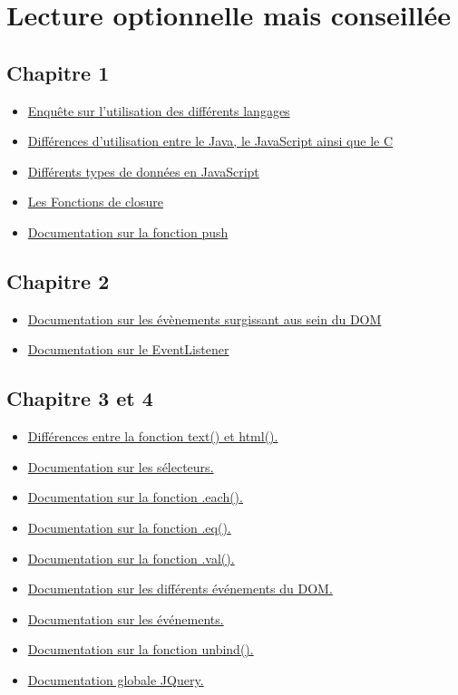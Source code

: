 \documentclass{article}[12pt]
\begin{document}
\section{Lecture optionnelle mais conseillée}
\subsection{Chapitre 1}
\begin{itemize}
	\item \href{http://stackoverflow.com/research/developer-survey-2016}{Enquête sur l'utilisation des différents langages}
    \item \href{http://www.stefankrause.net/wp/?p=144}{Différences d'utilisation entre le Java, le JavaScript ainsi que le C}
    \item \href{http://www.w3schools.com/js/js_datatypes.asp}{Différents types de données en JavaScript}
    \item \href{http://www.w3schools.com/js/js_function_closures.asp}{Les Fonctions de closure}
	\item \href{http://www.w3schools.com/jsref/jsref_push.asp}{Documentation sur la fonction push}
\end{itemize}
\subsection{Chapitre 2}
\begin{itemize}
    \item \href{http://www.w3schools.com/jsref/dom_obj_event.asp}{Documentation sur les évènements surgissant aus sein du DOM}
    \item \href{http://www.w3schools.com/js/js_htmldom_eventlistener.asp}{Documentation sur le EventListener}
\end{itemize}
\subsection{Chapitre 3 et 4}
\begin{itemize}
	\item \href{http://stackoverflow.com/questions/1910794/what-is-the-difference-between-jquery-text-and-html}{Différences entre la fonction text() et html().}
    \item \href{http://api.jquery.com/category/selectors/}{Documentation sur les sélecteurs.}
    \item \href{http://api.jquery.com/each/}{Documentation sur la fonction .each().}
    \item \href{http://api.jquery.com/eq/}{Documentation sur la fonction .eq().}
    \item \href{http://api.jquery.com/val/}{Documentation sur la fonction .val().}
    \item \href{http://www.w3schools.com/jsref/dom_obj_event.asp}{Documentation sur les différents événements du DOM.}
    \item \href{http://api.jquery.com/category/events/}{Documentation sur les événements.}
    \item \href{http://api.jquery.com/unbind/}{Documentation sur la fonction unbind().}
    \item \href{https://api.jquery.com}{Documentation globale JQuery.}
\end{itemize}
\end{document}
